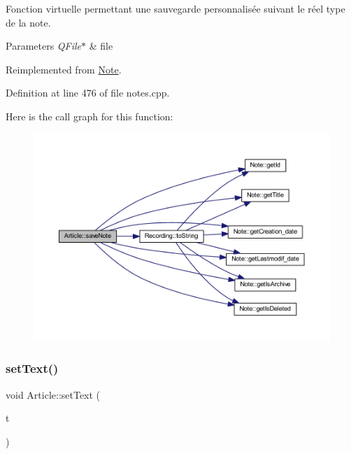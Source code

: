 Fonction virtuelle permettant une sauvegarde personnalisée suivant le réel type de la note. 


\begin{DoxyParams}{Parameters}
{\em Q\+File$\ast$} & file \\
\hline
\end{DoxyParams}


Reimplemented from \hyperlink{class_note_a0c2cc72d7f3235c665a30ef915c5c58d}{Note}.



Definition at line 476 of file notes.\+cpp.

Here is the call graph for this function\+:\nopagebreak
\begin{figure}[H]
\begin{center}
\leavevmode
\includegraphics[width=350pt]{class_article_a83c6688e4886b871938b9dca34e78041_cgraph}
\end{center}
\end{figure}
\mbox{\label{class_article_a7144942027b1761cfcbd21761dd5cee8}} 
\subsubsection{\texorpdfstring{set\+Text()}{setText()}}
{\footnotesize\ttfamily void Article\+::set\+Text (\begin{DoxyParamCaption}\item[{const Q\+String \&}]{t }\end{DoxyParamCaption})\hspace{0.3cm}{\ttfamily [inline]}}



